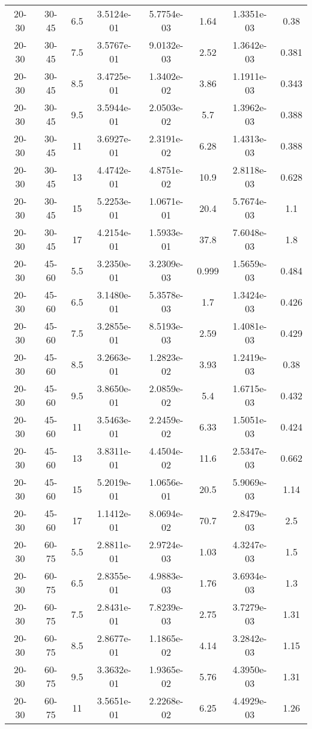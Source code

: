 \begin{longtable}{|cccccccc|}
20-30 & 30-45 & 6.5 & 3.5124e-01 & 5.7754e-03 & 1.64 & 1.3351e-03 & 0.38 \\ 
20-30 & 30-45 & 7.5 & 3.5767e-01 & 9.0132e-03 & 2.52 & 1.3642e-03 & 0.381 \\ 
20-30 & 30-45 & 8.5 & 3.4725e-01 & 1.3402e-02 & 3.86 & 1.1911e-03 & 0.343 \\ 
20-30 & 30-45 & 9.5 & 3.5944e-01 & 2.0503e-02 & 5.7 & 1.3962e-03 & 0.388 \\ 
20-30 & 30-45 & 11 & 3.6927e-01 & 2.3191e-02 & 6.28 & 1.4313e-03 & 0.388 \\ 
20-30 & 30-45 & 13 & 4.4742e-01 & 4.8751e-02 & 10.9 & 2.8118e-03 & 0.628 \\ 
20-30 & 30-45 & 15 & 5.2253e-01 & 1.0671e-01 & 20.4 & 5.7674e-03 & 1.1 \\ 
20-30 & 30-45 & 17 & 4.2154e-01 & 1.5933e-01 & 37.8 & 7.6048e-03 & 1.8 \\ 
\hline
20-30 & 45-60 & 5.5 & 3.2350e-01 & 3.2309e-03 & 0.999 & 1.5659e-03 & 0.484 \\ 
20-30 & 45-60 & 6.5 & 3.1480e-01 & 5.3578e-03 & 1.7 & 1.3424e-03 & 0.426 \\ 
20-30 & 45-60 & 7.5 & 3.2855e-01 & 8.5193e-03 & 2.59 & 1.4081e-03 & 0.429 \\ 
20-30 & 45-60 & 8.5 & 3.2663e-01 & 1.2823e-02 & 3.93 & 1.2419e-03 & 0.38 \\ 
20-30 & 45-60 & 9.5 & 3.8650e-01 & 2.0859e-02 & 5.4 & 1.6715e-03 & 0.432 \\ 
20-30 & 45-60 & 11 & 3.5463e-01 & 2.2459e-02 & 6.33 & 1.5051e-03 & 0.424 \\ 
20-30 & 45-60 & 13 & 3.8311e-01 & 4.4504e-02 & 11.6 & 2.5347e-03 & 0.662 \\ 
20-30 & 45-60 & 15 & 5.2019e-01 & 1.0656e-01 & 20.5 & 5.9069e-03 & 1.14 \\ 
20-30 & 45-60 & 17 & 1.1412e-01 & 8.0694e-02 & 70.7 & 2.8479e-03 & 2.5 \\ 
\hline
20-30 & 60-75 & 5.5 & 2.8811e-01 & 2.9724e-03 & 1.03 & 4.3247e-03 & 1.5 \\ 
20-30 & 60-75 & 6.5 & 2.8355e-01 & 4.9883e-03 & 1.76 & 3.6934e-03 & 1.3 \\ 
20-30 & 60-75 & 7.5 & 2.8431e-01 & 7.8239e-03 & 2.75 & 3.7279e-03 & 1.31 \\ 
20-30 & 60-75 & 8.5 & 2.8677e-01 & 1.1865e-02 & 4.14 & 3.2842e-03 & 1.15 \\ 
20-30 & 60-75 & 9.5 & 3.3632e-01 & 1.9365e-02 & 5.76 & 4.3950e-03 & 1.31 \\ 
20-30 & 60-75 & 11 & 3.5651e-01 & 2.2268e-02 & 6.25 & 4.4929e-03 & 1.26 \\ 

\end{longtable}
